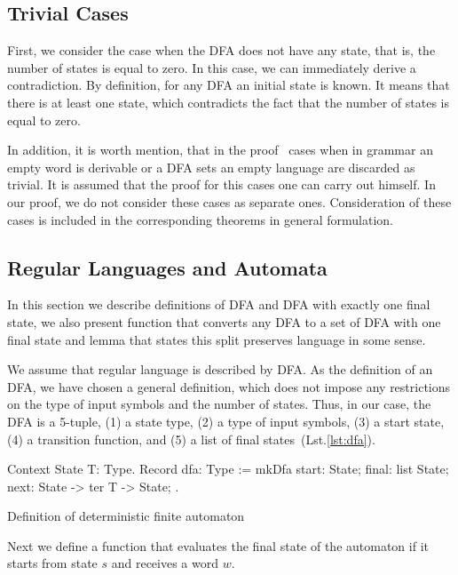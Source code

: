 \subsection{Trivial Cases}

First, we consider the case when the DFA does not have any state, that is, the number of states is equal to zero. 
In this case, we can immediately derive a contradiction.
By definition, for any DFA an initial state is known. 
It means that there is at least one state, which contradicts the fact that the number of states is equal to zero.

In addition, it is worth mention, that in the proof~\cite{beigelproof} cases when in grammar an empty word is derivable or a DFA sets an empty language are discarded as trivial.
It is assumed that the proof for this cases one can carry out himself.
In our proof, we do not consider these cases as separate ones.
Consideration of these cases is included in the corresponding theorems in general formulation.

\subsection{Regular Languages and Automata}

In this section we describe definitions of DFA and DFA with exactly one final state, we also present function that converts any DFA to a set of DFA with one final state and lemma that states this split preserves language in some sense.

We assume that regular language is described by DFA. As the definition of an DFA, we have chosen a general definition, which does not impose any restrictions on the type of input symbols and the number of states. Thus, in our case, the DFA is a 5-tuple, (1) a state type, (2) a type of input symbols, (3) a start state, (4) a transition function, and (5) a list of final states~(Lst.\ref{lst:dfa}).

\begin{listing}[h]
    \begin{pyglist}[language=coq, numbers=none, numbersep=5pt]
  Context {State T: Type}.
  Record dfa: Type :=
    mkDfa {
      start: State;
      final: list State;
      next: State -> ter T -> State;
    }.
    \end{pyglist}
    \caption{Definition of deterministic finite automaton}
    \label{lst:dfa}
\end{listing}

Next we define a function that evaluates the final state of the automaton if it starts from state $s$ and receives a word $w$. 

